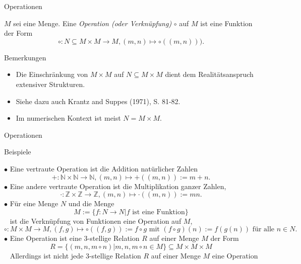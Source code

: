 \documentclass[
  8pt,
  ignorenonframetext,
]{beamer}
\providecommand{\tightlist}{%
  \setlength{\itemsep}{0pt}\setlength{\parskip}{0pt}}
\begin{document}
\begin{frame}{Operationen}
\protect\hypertarget{operationen-1}{}
\small
\begin{definition}[Operation]
$M$ sei eine Menge. Eine \textit{Operation (oder Verknüpfung)} $\circ$ auf $M$ ist eine
Funktion der Form
\begin{equation}
\circ : N \subseteq M \times M \to M, (m,n) \mapsto \circ((m,n))).
\end{equation}
\end{definition}
\footnotesize

Bemerkungen

\begin{itemize}
\tightlist
\item
  Die Einschränkung von \(M \times M\) auf \(N \subseteq M \times M\)
  dient dem Realitätsanspruch extensiver Strukturen.
\item
  Siehe dazu auch Krantz and Suppes (1971), S. 81-82.
\item
  Im numerischen Kontext ist meist \(N = M \times M\).
\end{itemize}
\end{frame}

\begin{frame}{Operationen}
\protect\hypertarget{operationen-2}{}
\small

Beispiele

\footnotesize

\(\bullet\) Eine vertraute Operation ist die Addition natürlicher Zahlen
\begin{equation}
+ : \mathbb{N} \times \mathbb{N} \to \mathbb{N}, (m,n) \mapsto +((m,n)) := m + n.
\end{equation} \(\bullet\) Eine andere vertraute Operation ist die
Multiplikation ganzer Zahlen, \begin{equation}
\cdot : \mathbb{Z} \times \mathbb{Z} \to \mathbb{Z}, (m,n) \mapsto \cdot((m,n)) := mn.
\end{equation} \(\bullet\) Für eine Menge \(N\) und die Menge
\begin{equation}
M := \{f : N \to N| f \mbox{ ist eine Funktion}\}
\end{equation} \(\,\,\,\) ist die Verknüpfung von Funktionen eine
Operation auf \(M\), \begin{equation}
\circ : M \times M \to M, (f,g) \mapsto \circ((f,g)) := f \circ g \mbox{ mit } (f \circ g)(n) := f(g(n)) \mbox{ für alle } n \in N.
\end{equation} \(\bullet\) Eine Operation ist eine 3-stellige Relation
\(R\) auf einer Menge \(M\) der Form \begin{equation}
R = \{(m,n, m\circ n)|m,n,m\circ n \in M\} \subseteq M \times M \times M
\end{equation} \(\,\,\,\) Allerdings ist nicht jede 3-stellige Relation
\(R\) auf einer Menge \(M\) eine Operation
\end{frame}
\end{document}
